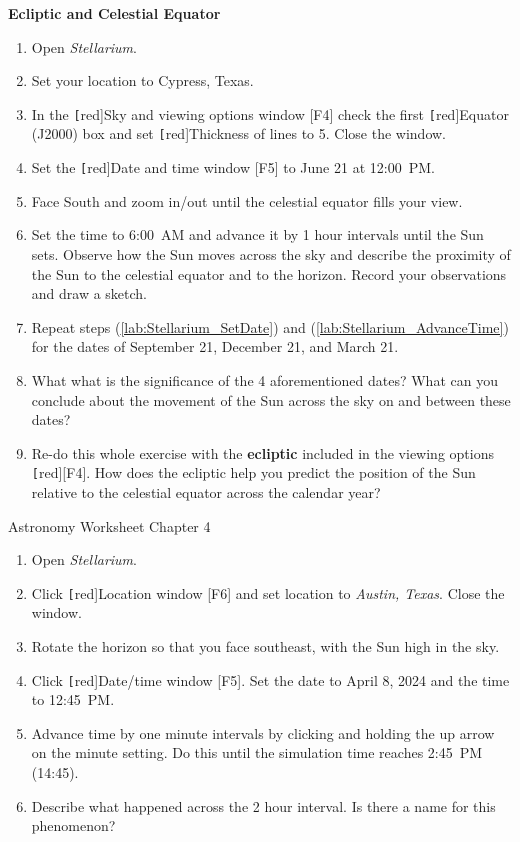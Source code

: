 \documentclass{article}
\newcounter{mycounter}
\begin{document}
\textbf{Ecliptic and Celestial Equator}
\vspace{-1em}

\begin{enumerate}
\setlength\parskip{0pt}
    \item Open \textit{Stellarium}.
    \item Set your location to Cypress, Texas.
    \item In the \texttt[red]{Sky and viewing options window [F4]} check the first \texttt[red]{Equator (J2000)} box and set \texttt[red]{Thickness} of lines to 5. Close the window.
    \item \label{lab:Stellarium_SetDate} Set the \texttt[red]{Date and time window [F5]} to June 21 at 12:00~PM.
    \item Face South and zoom in/out until the celestial equator fills your view.
    \item \label{lab:Stellarium_AdvanceTime} Set the time to 6:00~AM and advance it by 1 hour intervals until the Sun sets. Observe how the Sun moves across the sky and describe the proximity of the Sun to the celestial equator and to the horizon. Record your observations and draw a sketch.
    \item Repeat steps (\ref{lab:Stellarium_SetDate}) and (\ref{lab:Stellarium_AdvanceTime}) for the dates of September 21, December 21, and March 21. 
    \item What what is the significance of the 4 aforementioned dates? What can you conclude about the movement of the Sun across the sky on and between these dates?
    \item Re-do this whole exercise with the \textbf{ecliptic} included in the viewing options \texttt[red]{[F4]}. How does the ecliptic help you predict the position of the Sun relative to the celestial equator across the calendar year?
    
\end{enumerate}

\clearpage


Astronomy \hfill Worksheet \themycounter \hfill Chapter 4
\vspace{1em}


\begin{enumerate}
\setlength\parskip{0pt}
    \item Open \textit{Stellarium}.
    \item Click \texttt[red]{Location window [F6]} and set location to \textit{Austin, Texas}. Close the window.
    \item Rotate the horizon so that you face southeast, with the Sun high in the sky.
    \item Click \texttt[red]{Date/time window [F5]}. Set the date to April 8, 2024 and the time to 12:45~PM. 
    \item Advance time by one minute intervals by clicking and holding the up arrow on the minute setting. Do this until the simulation time reaches 2:45~PM (14:45).
    \item Describe what happened across the 2 hour interval. Is there a name for this phenomenon?
\end{enumerate}
\end{document}
